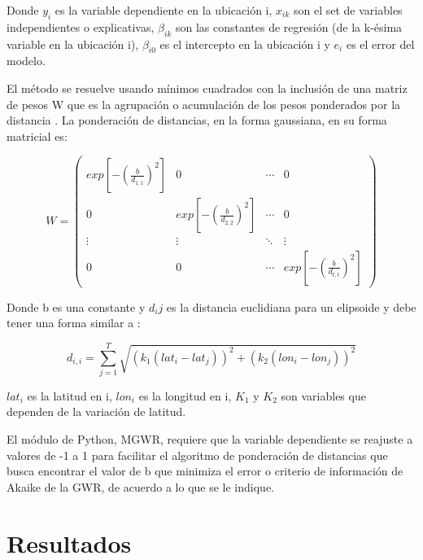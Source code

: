 \documentclass[12pt,letterpaper]{article}
\begin{document}
Donde $y_i$ es la variable dependiente en la ubicación i, $x_{ik}$ son el set de variables independientes o explicativas, $\beta_{ik}$ son las constantes de regresión (de la k-ésima variable en la ubicación i), $\beta_{i0}$ es el intercepto en la ubicación i y $e_i$ es el error del modelo. 

El método se resuelve usando mínimos cuadrados con la inclusión de una matriz de pesos W que es la agrupación o acumulación de los pesos ponderados por la distancia \cite{b}. La ponderación de distancias, en la forma gaussiana, en su forma matricial es:


\begin{equation*}
W = 
\begin{pmatrix}
exp[-(\frac{b}{d_{1,1}})^2] & 0 & \cdots & 0 \\
0 & exp[-(\frac{b}{d_{2,2}})^2] & \cdots & 0 \\
\vdots  & \vdots  & \ddots & \vdots  \\
0 & 0 & \cdots & exp[-(\frac{b}{d_{t,t}})^2]
\end{pmatrix}
\end{equation*}

Donde b es una constante y $d_ij$ es la distancia euclidiana para un elipsoide y debe tener una forma similar a \cite{d}:

\begin{equation*}
d_{i,i} = \sum_{j=1}^{T} \sqrt{ (k_{1} (lat_i-lat_j)  )^2 
	+ (k_{2} (lon_i-lon_j) )^2  }
\end{equation*}

$lat_i$ es la latitud en i, $lon_i$ es la longitud en i,  $K_1$ y $K_2$ son variables que dependen de la variación de latitud.


El módulo de Python, MGWR, requiere que la variable dependiente se reajuste a valores de -1 a 1 para facilitar el algoritmo de ponderación de distancias que busca encontrar el valor de b que minimiza el error o criterio de información de Akaike de la GWR, de acuerdo a lo que se le indique.

\section{Resultados}
\end{document}
